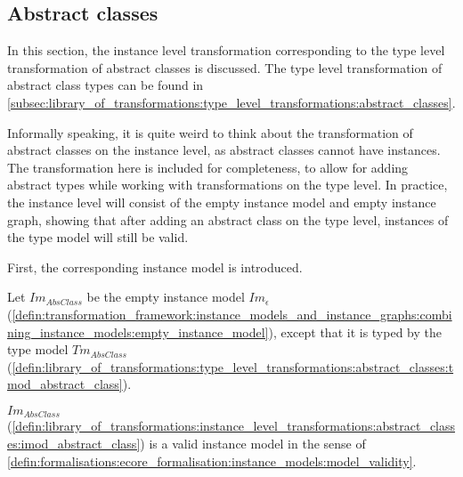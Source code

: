 \subsection{Abstract classes}
\label{subsec:library_of_transformations:instance_level_transformations:abstract_classes}

In this section, the instance level transformation corresponding to the type level transformation of abstract classes is discussed. The type level transformation of abstract class types can be found in \cref{subsec:library_of_transformations:type_level_transformations:abstract_classes}.

Informally speaking, it is quite weird to think about the transformation of abstract classes on the instance level, as abstract classes cannot have instances. The transformation here is included for completeness, to allow for adding abstract types while working with transformations on the type level. In practice, the instance level will consist of the empty instance model and empty instance graph, showing that after adding an abstract class on the type level, instances of the type model will still be valid.

First, the corresponding instance model is introduced.

\begin{defin}
\label{defin:library_of_transformations:instance_level_transformations:abstract_classes:imod_abstract_class}
Let $Im_{AbsClass}$ be the empty instance model $Im_\epsilon$ (\cref{defin:transformation_framework:instance_models_and_instance_graphs:combining_instance_models:empty_instance_model}), except that it is typed by the type model $Tm_{AbsClass}$ (\cref{defin:library_of_transformations:type_level_transformations:abstract_classes:tmod_abstract_class}).
\end{defin}

\begin{thm}
\label{defin:library_of_transformations:instance_level_transformations:abstract_classes:imod_abstract_class_correct}
$Im_{AbsClass}$ (\cref{defin:library_of_transformations:instance_level_transformations:abstract_classes:imod_abstract_class}) is a valid instance model in the sense of \cref{defin:formalisations:ecore_formalisation:instance_models:model_validity}.
\end{thm}

